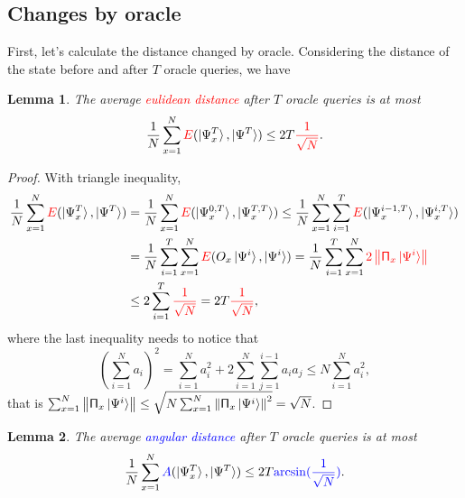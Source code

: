 \documentclass[a4paper,10pt]{article}
\newtheorem{lemma}{Lemma}[subsection]
\numberwithin{equation}{subsection}
\begin{document}
\subsection{Changes by oracle}

First, let's calculate the distance changed by oracle. Considering the distance of the state before and after $T$ oracle queries, we have
\begin{lemma}
    The average \textcolor{red}{eulidean distance} after $T$ oracle queries is at most
    \begin{equation}
        \frac{1}{N}\sum_{x=1}^{N}\textcolor{red}{E}(\ket{\Psi_{x}^{T}},\ket{\Psi^{T}})\leq 2T\textcolor{red}{\frac{1}{\sqrt{N}}}.
    \end{equation}
\end{lemma}
\begin{proof}
    With triangle inequality,
    \begin{equation*}
        \begin{split}
            \frac{1}{N}\sum_{x=1}^{N}\textcolor{red}{E}(\ket{\Psi_{x}^{T}},\ket{\Psi^{T}})
             & = \frac{1}{N}\sum_{x=1}^{N}\textcolor{red}{E}(\ket{\Psi_{x}^{0,T}},\ket{\Psi_{x}^{T,T}})
            \leq \frac{1}{N}\sum_{x=1}^{N}\sum_{i=1}^{T}\textcolor{red}{E}(\ket{\Psi_{x}^{i-1,T}},\ket{\Psi_{x}^{i,T}}) \\
             & = \frac{1}{N}\sum_{i=1}^{T}\sum_{x=1}^{N}\textcolor{red}{E}(O_{x}\ket{\Psi^{i}},\ket{\Psi^{i}})
            = \frac{1}{N}\sum_{i=1}^{T}\sum_{x=1}^{N}\textcolor{red}{2\left\|\mathsf{\Pi}_{x}\ket{\Psi^{i}}\right\|}    \\
             & \leq 2\sum_{i=1}^{T}\textcolor{red}{\frac{1}{\sqrt{N}}} = 2T\textcolor{red}{\frac{1}{\sqrt{N}}},
        \end{split}
    \end{equation*}
    where the last inequality needs to notice that
    \begin{equation}\label{Cauchy-Schwarz}
        \left(\sum_{i=1}^{N}a_{i}\right)^{2}=\sum_{i=1}^{N}a_{i}^{2}+2\sum_{i=1}^{N}\sum_{j=1}^{i-1}a_{i}a_{j}\leq N\sum_{i=1}^{N}a_{i}^{2},
    \end{equation}
    that is $\sum_{x=1}^{N}\left\|\mathsf{\Pi}_{x}\ket{\Psi^{i}}\right\|\leq \sqrt{N\sum_{x=1}^{N}\left\|\mathsf{\Pi}_{x}\ket{\Psi^{i}}\right\|^{2}}=\sqrt{N}$.
\end{proof}
\begin{lemma}
    The average \textcolor{blue}{angular distance} after $T$ oracle queries is at most
    \begin{equation}
        \frac{1}{N}\sum_{x=1}^{N}\textcolor{blue}{A}(\ket{\Psi_{x}^{T}},\ket{\Psi^{T}})\leq 2T\textcolor{blue}{\arcsin(\frac{1}{\sqrt{N}})}.
    \end{equation}
\end{lemma}
\end{document}
